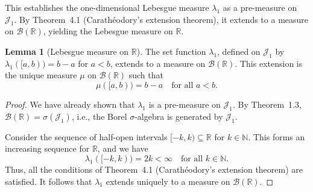 \documentclass[12pt]{article}
\theoremstyle{definition}
\newtheorem{lemma}[theorem]{Lemma}
\begin{document}
\noindent
This establishes the one-dimensional Lebesgue measure $\lambda_1$ as a pre-measure on $\mathcal{J}_1$. By Theorem~4.1 (Carathéodory's extension theorem), it extends to a measure on $\mathcal{B}(\mathbb{R})$, yielding the Lebesgue measure on $\mathbb{R}$.

\medskip
\begin{lemma}[Lebesgue measure on $\mathbb{R}$]
The set function $\lambda_1$, defined on $\mathcal{J}_1$ by $\lambda_1([a,b)) = b - a$ for $a < b$, extends to a measure on $\mathcal{B}(\mathbb{R})$. This extension is the unique measure $\mu$ on $\mathcal{B}(\mathbb{R})$ such that
\[
\mu([a,b)) = b - a \quad \text{for all } a < b.
\]
\end{lemma}

\begin{proof}
We have already shown that $\lambda_1$ is a pre-measure on $\mathcal{J}_1$. By Theorem~1.3, $\mathcal{B}(\mathbb{R}) = \sigma(\mathcal{J}_1)$, i.e., the Borel $\sigma$-algebra is generated by $\mathcal{J}_1$. 

Consider the sequence of half-open intervals $[-k, k) \subseteq \mathbb{R}$ for $k \in \mathbb{N}$. This forms an increasing sequence for $\mathbb{R}$, and we have
\[
\lambda_1([-k,k)) = 2k < \infty \quad \text{for all } k \in \mathbb{N}.
\]
Thus, all the conditions of Theorem~4.1 (Carathéodory's extension theorem) are satisfied. It follows that $\lambda_1$ extends uniquely to a measure on $\mathcal{B}(\mathbb{R})$.
\end{proof}
\end{document}
